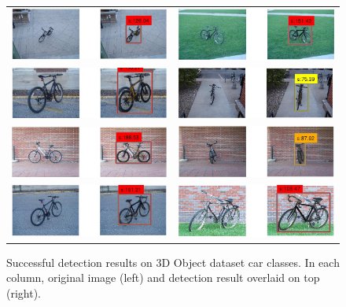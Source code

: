 \documentclass[10pt,twocolumn,letterpaper]{article}
\begin{document}
\begin{figure}[h]
\setlength\tabcolsep{1pt}
\centering
\begin{tabular}{|c|c|}
  \hline
  \includegraphics[width=0.40\linewidth]{supp/bicycle17.png} &
  \includegraphics[width=0.40\linewidth]{supp/bicycle18.png} \\
  \includegraphics[width=0.40\linewidth]{supp/bicycle13.png} &
  \includegraphics[width=0.40\linewidth]{supp/bicycle9.png} \\
  \includegraphics[width=0.40\linewidth]{supp/bicycle16.png} &
  \includegraphics[width=0.40\linewidth]{supp/bicycle12.png} \\
  \includegraphics[width=0.40\linewidth]{supp/bicycle15.png} &
  \includegraphics[width=0.40\linewidth]{supp/bicycle10.png} \\
  \hline
  \end{tabular}
\caption{Successful detection results on 3D Object dataset car
classes. In each column, original image (left) and detection result overlaid on
top (right).}%
  \label{fig:3dobject_bicycle_good}
\end{figure}
\end{document}
